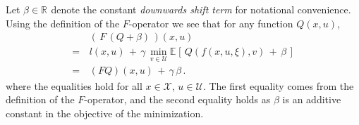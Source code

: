 \documentclass[journal]{IEEEtran}
\newcommand{\mcal}{\mathcal}
\newcommand{\rdim}[1]{\mathbb{R}^{#1}}
\newcommand{\expval}[2]{\mathbb{E}_{#1}\left[#2\right]}
\begin{document}
\vspace{0.2cm}

\begin{IEEEproof}
	Let $\beta \in \rdim{}$ denote the constant \emph{downwards shift term} for notational convenience. Using the definition of the $F$-operator we see that for any function $Q(x,u)$,
	\begin{equation} \nonumber
		\begin{aligned}
			&\, \left(\, F \, \left(Q + \beta\right) \,\right)(x,u)
			\\
			=&\, l(x,u) \,+\, \gamma \, \min_{v\in\mcal{U}} \expval{}{ \, Q(f(x,u,\xi),v) \,+\, \beta \, }
			\\
			=&\, \left(F Q\right)(x,u) \,+\, \gamma \, \beta
				\,.
		\end{aligned}
	\end{equation}
	where the equalities hold for all $x\in\mcal{X}$, $u\in\mcal{U}$. The first equality comes from the definition of the $F$-operator, and the second equality holds as $\beta$ is an additive constant in the objective of the minimization.
	

\end{IEEEproof}
\end{document}
